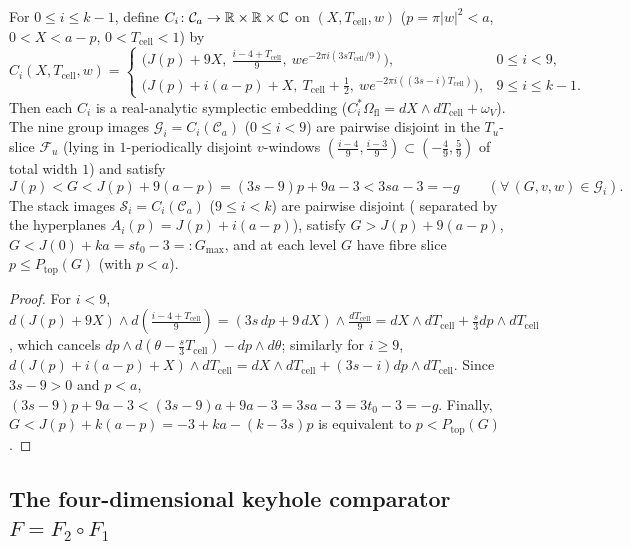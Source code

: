 \begin{lemma}\label{lem:cell-flat}
For $0\le i\le k-1$, define $C_i\colon\mathcal C_a\to\mathbb{R}\times\mathbb{R}\times\mathbb{C}$ on $(X,T_{\mathrm{cell}},w)$ ($p=\pi|w|^2<a$,
$0<X<a-p$, $0<T_{\mathrm{cell}}<1$) by
\[
 C_i(X,T_{\mathrm{cell}},w)=
 \begin{cases}
  \bigl(J(p)+9X,\ \frac{i-4+T_{\mathrm{cell}}}{9},\ we^{-2\pi i(3sT_{\mathrm{cell}}/9)}\bigr), & 0\le i<9,\\[4pt]
  \bigl(J(p)+i(a-p)+X,\ T_{\mathrm{cell}}+\frac12,\ we^{-2\pi i((3s-i)T_{\mathrm{cell}})}\bigr), & 9\le i\le k-1.
 \end{cases}
\]
Then each $C_i$ is a real-analytic symplectic embedding ($C_i^*\Omega_{\mathrm{fl}}=dX\wedge dT_{\mathrm{cell}}+\omega_V$).
The nine group images $\mathcal G_i=C_i(\mathcal C_a)$ ($0\le i<9$) are pairwise disjoint in the $T_u$-slice
$\mathcal F_u$ (lying in $1$-periodically disjoint $v$-windows $(\frac{i-4}{9},\frac{i-3}{9})\subset(-\frac49,\frac59)$
of total width $1$) and satisfy
\begin{equation}\label{eq:group-G-bound}
 J(p) < G < J(p)+9(a-p) = (3s-9)p + 9a - 3 < 3sa - 3 = -g\qquad(\forall\,(G,v,w)\in\mathcal G_i).
\end{equation}
The stack images $\mathcal S_i=C_i(\mathcal C_a)$ ($9\le i<k$) are pairwise disjoint ( separated by the hyperplanes
$A_i(p)=J(p)+i(a-p)$), satisfy $G>J(p)+9(a-p)$, $G<J(0)+ka=st_0-3=:G_{\max}$, and at each level $G$ have fibre slice
$p\le P_{\mathrm{top}}(G)$ (with $p<a$).
\end{lemma}

\begin{proof}
For $i<9$, $d(J(p)+9X)\wedge d(\frac{i-4+T_{\mathrm{cell}}}{9})=(3s\,dp+9\,dX)\wedge\frac{dT_{\mathrm{cell}}}{9}
=dX\wedge dT_{\mathrm{cell}}+\frac{s}{3}dp\wedge dT_{\mathrm{cell}}$, which cancels $dp\wedge d(\theta-\frac{s}{3}T_{\mathrm{cell}})-dp\wedge d\theta$;
similarly for $i\ge9$, $d(J(p)+i(a-p)+X)\wedge dT_{\mathrm{cell}}=dX\wedge dT_{\mathrm{cell}}+(3s-i)dp\wedge dT_{\mathrm{cell}}$.
Since $3s-9>0$ and $p<a$, $(3s-9)p+9a-3<(3s-9)a+9a-3=3sa-3=3t_0-3=-g$. Finally, $G<J(p)+k(a-p)=-3+ka-(k-3s)p$ is
equivalent to $p<P_{\mathrm{top}}(G)$.
\end{proof}

\subsection{The four-dimensional keyhole comparator $F=F_2\circ F_1$}\label{sec:cmp-F}

